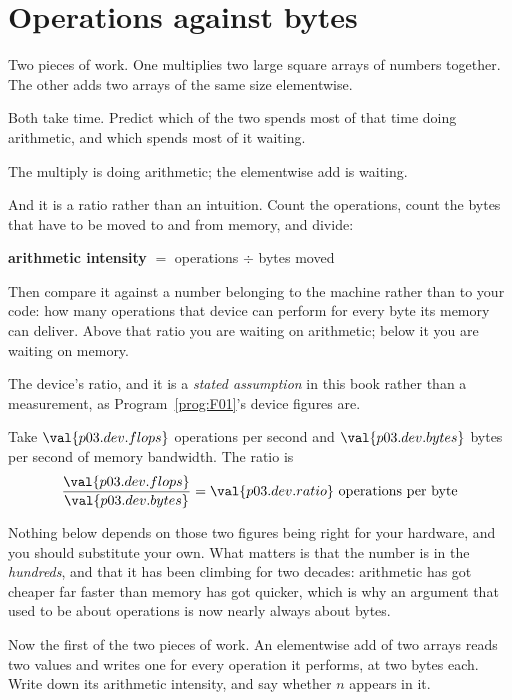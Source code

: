 \section{Operations against bytes}
\label{sec:P03-intensity}

\begin{fr}
Two pieces of work. One multiplies two large square arrays of numbers together.
The other adds two arrays of the same size elementwise.

Both take time. Predict which of the two spends most of that time doing
arithmetic, and which spends most of it waiting.
\nextframe
\end{fr}

\begin{fr}
\begin{ansblock}
The multiply is doing arithmetic; the elementwise add is waiting.
\end{ansblock}

And it is a ratio rather than an intuition. Count the operations, count the
bytes that have to be moved to and from memory, and divide:

\medskip
\noindent
\textbf{arithmetic intensity} $=$ operations $\div$ bytes moved

\medskip
\noindent
Then compare it against a number belonging to the machine rather than to your
code: how many operations that device can perform for every byte its memory
can deliver. Above that ratio you are waiting on arithmetic; below it you are
waiting on memory.
\end{fr}


\begin{fr}
The device's ratio, and it is a \emph{stated assumption} in this book rather
than a measurement, as Program~\ref{prog:F01}'s device figures are.

Take $\val{p03.dev.flops}$ operations per second and
$\val{p03.dev.bytes}$ bytes per second of memory bandwidth. The ratio is
\[ \frac{\val{p03.dev.flops}}{\val{p03.dev.bytes}}
   = \val{p03.dev.ratio} \text{ operations per byte} \]

Nothing below depends on those two figures being right for your hardware, and
you should substitute your own. What matters is that the number is in the
\emph{hundreds}, and that it has been climbing for two decades: arithmetic has
got cheaper far faster than memory has got quicker, which is why an argument
that used to be about operations is now nearly always about bytes.

Now the first of the two pieces of work. An elementwise add of two arrays
reads two values and writes one for every operation it performs, at two bytes
each. Write down its arithmetic intensity, and say whether $n$ appears in it.
\dotline
\nextframe
\end{fr}

